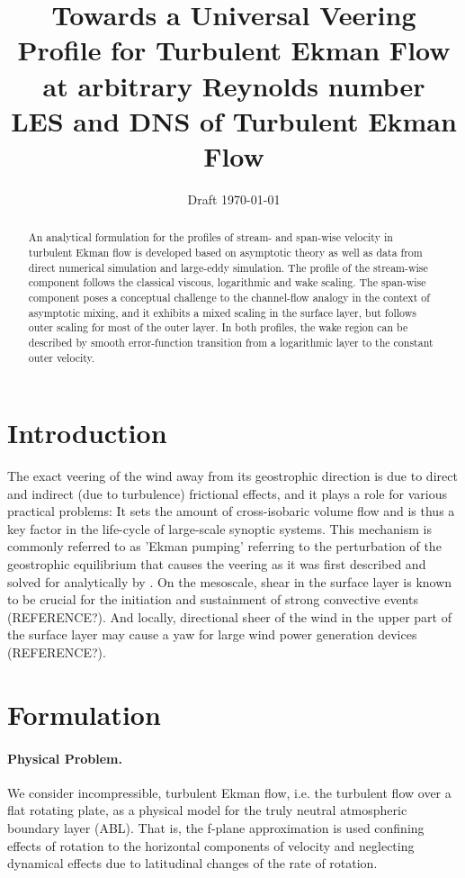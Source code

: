 \documentclass[a4paper,11pt]{article}
\date{Draft \today}
\title{Towards a Universal Veering Profile for Turbulent Ekman Flow at arbitrary Reynolds number \\
  \normalsize LES and DNS of Turbulent Ekman Flow \\}
\begin{document}
 

\maketitle

\begin{abstract}
  An analytical formulation for the profiles of stream- and span-wise velocity in turbulent Ekman flow
  is developed based on asymptotic theory as well as data from direct numerical simulation and large-eddy simulation.
  The profile of the stream-wise component follows the classical viscous, logarithmic and wake scaling.
  The span-wise component poses a conceptual challenge to the channel-flow analogy
  in the context of asymptotic mixing, and it exhibits a mixed scaling in the surface layer, but follows
  outer scaling for most of the outer layer.
  In both profiles, the wake region can be described by smooth error-function transition from a logarithmic layer
  to the constant outer velocity.
  
\end{abstract}
%
%
\section{Introduction}

The exact veering of the wind away from its geostrophic direction is due to direct and indirect (due to turbulence) frictional effects,
and it plays a role for various practical problems: 
%
It sets the amount of cross-isobaric volume flow and is thus a key factor in the life-cycle of large-scale synoptic systems. This mechanism is commonly
referred to as 'Ekman pumping' referring to the perturbation of the geostrophic equilibrium that causes the veering as it was first described
and solved for analytically by \cite{Ekman:1905tl}.
%
On the mesoscale, shear in the surface layer is known to be crucial for the initiation and sustainment of strong convective events (REFERENCE?).
% 
And locally, directional sheer of the wind in the upper part of the surface layer may cause a yaw for large wind power generation devices (REFERENCE?).
%
%
\section{Formulation}
%
\paragraph{Physical Problem.} We consider incompressible, turbulent Ekman flow, i.e. the turbulent flow over a flat rotating plate, as
a physical model for the truly neutral atmospheric boundary layer (ABL).
%
That is, the f-plane approximation is used confining effects of rotation to the horizontal components of
velocity and neglecting dynamical effects due to latitudinal changes of the rate of rotation. 
%
%
\end{document}
